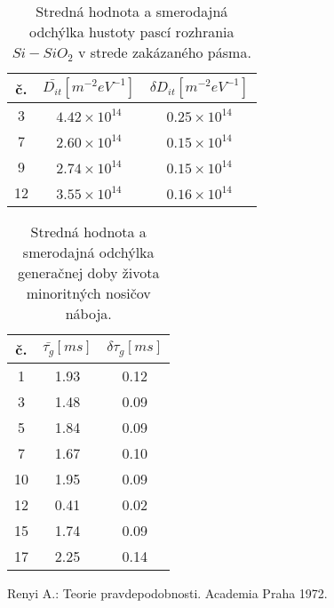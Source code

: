 \begin{table}[h!]\centering
  \begin{minipage}[c]{\myfiguresize}
    \begin{center}
      \begin{tabular}{c c c}
        č. & ${\bar{D_{it}}}[m^{-2}eV^{-1}]$ & $\delta D_{it}[m^{-2}eV^{-1}]$\\ 
        \hline
         3 & $4.42 \times 10^{14}$ & $0.25 \times 10^{14}$\\
         7 & $2.60 \times 10^{14}$ & $0.15 \times 10^{14}$\\
         9 & $2.74 \times 10^{14}$ & $0.15 \times 10^{14}$\\
        12 & $3.55 \times 10^{14}$ & $0.16 \times 10^{14}$\\
      \end{tabular}
    \end{center}
    \caption[Stredná hodnota a smerodajná odchýlka hustoty pascí
      rozhrania $Si-SiO_{2}$ v strede zakázaného pásma.]{Stredná
      hodnota a smerodajná odchýlka hustoty pascí rozhrania
      $Si-SiO_{2}$ v strede zakázaného pásma.}\label{tab:7.5}
  \end{minipage}
\end{table}

\begin{table}[h!]\centering
  \begin{minipage}[c]{\myfiguresize}
    \begin{center}
      \begin{tabular}{c c c}
        č. & ${\bar{\tau_{g}}}[ms]$ & $\delta\tau_{g}[ms]$\\ 
        \hline
         1 & 1.93 & 0.12\\
         3 & 1.48 & 0.09\\
         5 & 1.84 & 0.09\\
         7 & 1.67 & 0.10\\
        10 & 1.95 & 0.09\\
        12 & 0.41 & 0.02\\
        15 & 1.74 & 0.09\\
        17 & 2.25 & 0.14\\
      \end{tabular}
    \end{center}
   \caption[Stredná hodnota a smerodajná odchýlka generačnej doby
     života minoritných nosičov náboja]{Stredná hodnota a smerodajná
     odchýlka generačnej doby života minoritných nosičov
     náboja.}\label{tab:7.6}
  \end{minipage}
\end{table}


\begin{thebibliography}{}
  Renyi A.: Teorie pravdepodobnosti. Academia Praha 1972.
\end{thebibliography}
